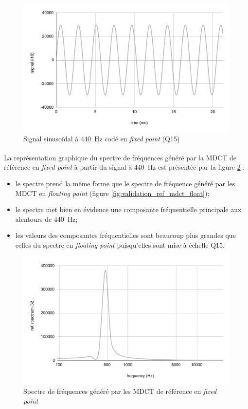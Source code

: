 \documentclass{article}
\begin{document}
    \begin{figure}[H]
        \centering
        \includegraphics[width=.8\linewidth]{./images/signal_i16.pdf}
        \caption{Signal sinusoïdal à \SI{440}{\hertz} codé en \emph{fixed point} (Q15)}
        \label{fig:signal_i16}
    \end{figure}

    \paragraph{}
    La représentation graphique du spectre de fréquences généré par la MDCT de référence en \emph{fixed point} à partir du signal à \SI{440}{\hertz} est présentée par la figure \ref{fig:validation_ref_mdct_int} :
    \begin{itemize}
        \item le spectre prend la même forme que le spectre de fréquence généré par les MDCT en \emph{floating point} (figure \ref{fig:validation_ref_mdct_float});
        \item le spectre met bien en évidence une composante fréquentielle principale aux alentours de \SI{440}{\hertz};
        \item les valeurs des composantes fréquentielles sont beaucoup plus grandes que celles du spectre en \emph{floating point} puisqu'elles sont mise à échelle Q15.
    \end{itemize}

    \begin{figure}[H]
        \centering
        \includegraphics[width=.8\linewidth]{./images/validation_ref_int.pdf}
        \caption{Spectre de fréquences généré par les MDCT de référence en \emph{fixed point}}
        \label{fig:validation_ref_mdct_int}
    \end{figure}
\end{document}
